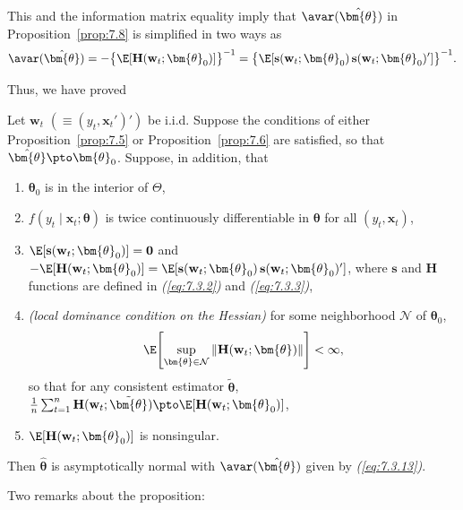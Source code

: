 This and the information matrix equality imply that $\avar(\hat{\bm{\theta}})$ in Proposition~\ref{prop:7.8} is simplified in two ways as
\begin{equation}
\label{eq:7.3.13}
\avar(\hat{\bm{\theta}}) = -\bigl\{\E[\mathbf{H}(\mathbf{w}_t; \bm{\theta}_0)]\bigr\}^{-1} = \bigl\{\E[\mathbf{s}(\mathbf{w}_t; \bm{\theta}_0)\,\mathbf{s}(\mathbf{w}_t; \bm{\theta}_0)']\bigr\}^{-1}.
\end{equation}

Thus, we have proved

\begin{proposition}
\label{prop:7.9}
Let $\mathbf{w}_t$ $(\equiv (y_t, \mathbf{x}_t')')$ be i.i.d. Suppose the conditions of either Proposition~\ref{prop:7.5} or Proposition~\ref{prop:7.6} are satisfied, so that $\hat{\bm{\theta}} \pto \bm{\theta}_0$. Suppose, in addition, that
\begin{enumerate}
\item[(1)] $\bm{\theta}_0$ is in the interior of $\Theta$,
\item[(2)] $f(y_t \mid \mathbf{x}_t; \bm{\theta})$ is twice continuously differentiable in $\bm{\theta}$ for all $(y_t, \mathbf{x}_t)$,
\item[(3)] $\E[\mathbf{s}(\mathbf{w}_t; \bm{\theta}_0)] = \mathbf{0}$ and $-\E[\mathbf{H}(\mathbf{w}_t; \bm{\theta}_0)] = \E[\mathbf{s}(\mathbf{w}_t; \bm{\theta}_0)\,\mathbf{s}(\mathbf{w}_t; \bm{\theta}_0)']$, where $\mathbf{s}$ and $\mathbf{H}$ functions are defined in \emph{(\ref{eq:7.3.2})} and \emph{(\ref{eq:7.3.3})},
\item[(4)] \emph{(local dominance condition on the Hessian)} \enspace for some neighborhood $\mathcal{N}$ of $\bm{\theta}_0$,
\[
\E\!\left[\sup_{\bm{\theta} \in \mathcal{N}} \|\mathbf{H}(\mathbf{w}_t; \bm{\theta})\|\right] < \infty,
\]
so that for any consistent estimator $\tilde{\bm{\theta}}$, $\frac{1}{n}\sum_{t=1}^{n}\mathbf{H}(\mathbf{w}_t; \tilde{\bm{\theta}}) \pto \E[\mathbf{H}(\mathbf{w}_t; \bm{\theta}_0)]$,
\item[(5)] $\E[\mathbf{H}(\mathbf{w}_t; \bm{\theta}_0)]$ is nonsingular.
\end{enumerate}
Then $\hat{\bm{\theta}}$ is asymptotically normal with $\avar(\hat{\bm{\theta}})$ given by \emph{(\ref{eq:7.3.13})}.
\end{proposition}

Two remarks about the proposition:

